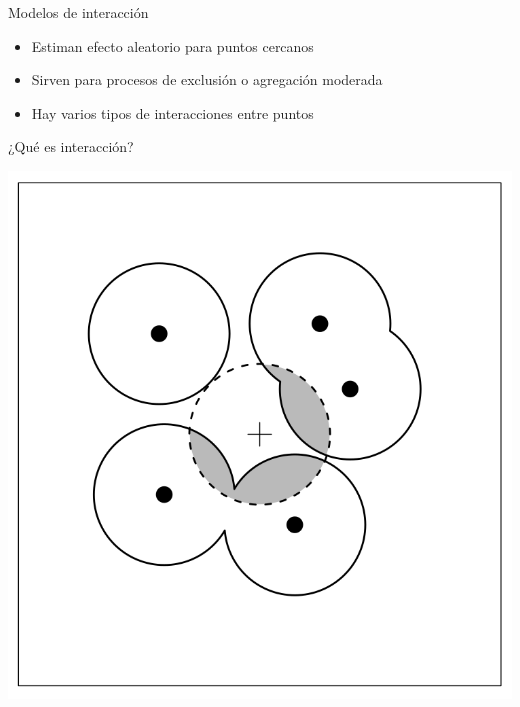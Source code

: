 \documentclass[
  11pt,
  ignorenonframetext,
]{beamer}
\providecommand{\tightlist}{%
  \setlength{\itemsep}{0pt}\setlength{\parskip}{0pt}}
\begin{document}
\begin{frame}{Modelos de interacción}
\protect\hypertarget{modelos-de-interacciuxf3n}{}
\begin{itemize}
\tightlist
\item
  Estiman efecto aleatorio para puntos cercanos
\item
  Sirven para procesos de exclusión o agregación moderada
\item
  Hay varios tipos de interacciones entre puntos
\end{itemize}
\end{frame}

\begin{frame}{¿Qué es interacción?}
\protect\hypertarget{quuxe9-es-interacciuxf3n}{}
\begin{center}\includegraphics{Figuras/Interaccion-puntos} \end{center}
\end{frame}
\end{document}
